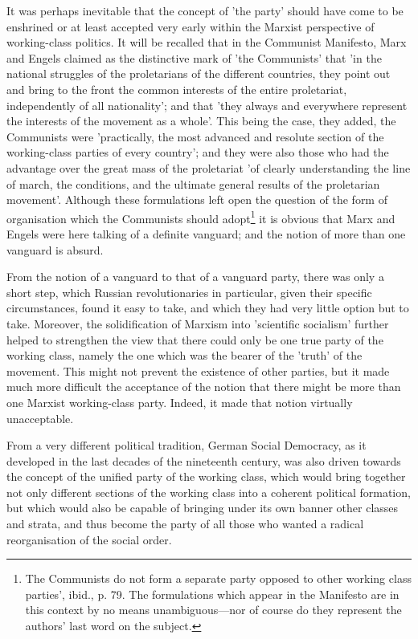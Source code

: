 It was perhaps inevitable that the concept of 'the party' should have come to be enshrined or at least accepted very early within the Marxist perspective of working-class politics. It will be recalled that in the Communist Manifesto, Marx and Engels claimed as the distinctive mark of 'the Communists' that 'in the national struggles of the proletarians of the different countries, they point out and bring to the front the common interests of the entire proletariat, independently of all nationality'; and that 'they always and everywhere represent the interests of the movement as a whole'. This being the case, they added, the Communists were 'practically, the most advanced and resolute section of the working-class parties of every country'; and they were also those who had the advantage over the great mass of the proletariat 'of clearly understanding the line of march, the conditions, and the ultimate general results of the proletarian movement'. Although these formulations left open the question of the form of organisation which the Communists should adopt\footnote{The Communists do not form a separate party opposed to other working class parties', ibid., p. 79. The formulations which appear in the Manifesto are in this context by no means unambiguous—nor of course do they represent the authors' last word on the subject.} it is obvious that Marx and Engels were here talking of a definite vanguard; and the notion of more than one vanguard is absurd.

From the notion of a vanguard to that of a vanguard party, there was only a short step, which Russian revolutionaries in particular, given their specific circumstances, found it easy to take, and which they had very little option but to take. Moreover, the solidification of Marxism into 'scientific socialism' further helped to strengthen the view that there could only be one true party of the working class, namely the one which was the bearer of the 'truth' of the movement. This might not prevent the existence of other parties, but it made much more difficult the acceptance of the notion that there might be more than one Marxist working-class party. Indeed, it made that notion virtually unacceptable.

From a very different political tradition, German Social Democracy, as it developed in the last decades of the nineteenth century, was also driven towards the concept of the unified party of the working class, which would bring together not only different sections of the working class into a coherent political formation, but which would also be capable of bringing under its own banner other classes and strata, and thus become the party of all those who wanted a radical reorganisation of the social order.

